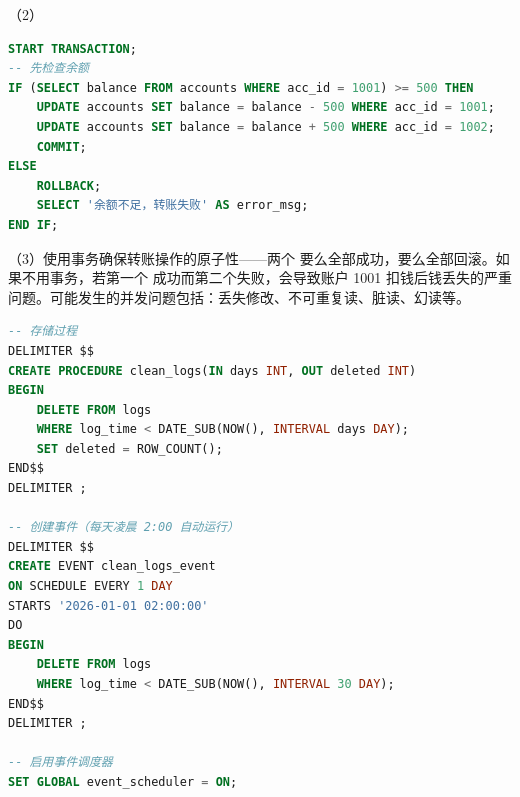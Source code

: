 \documentclass[a4paper,11pt]{article}
\begin{document}
\par （2）
\begin{lstlisting}[language=SQL]
START TRANSACTION;
-- 先检查余额
IF (SELECT balance FROM accounts WHERE acc_id = 1001) >= 500 THEN
    UPDATE accounts SET balance = balance - 500 WHERE acc_id = 1001;
    UPDATE accounts SET balance = balance + 500 WHERE acc_id = 1002;
    COMMIT;
ELSE
    ROLLBACK;
    SELECT '余额不足，转账失败' AS error_msg;
END IF;
\end{lstlisting}

\par （3）使用事务确保转账操作的原子性——两个  要么全部成功，要么全部回滚。如果不用事务，若第一个  成功而第二个失败，会导致账户 1001 扣钱后钱丢失的严重问题。可能发生的并发问题包括：丢失修改、不可重复读、脏读、幻读等。

\q
\begin{lstlisting}[language=SQL]
-- 存储过程
DELIMITER $$
CREATE PROCEDURE clean_logs(IN days INT, OUT deleted INT)
BEGIN
    DELETE FROM logs
    WHERE log_time < DATE_SUB(NOW(), INTERVAL days DAY);
    SET deleted = ROW_COUNT();
END$$
DELIMITER ;

-- 创建事件（每天凌晨 2:00 自动运行）
DELIMITER $$
CREATE EVENT clean_logs_event
ON SCHEDULE EVERY 1 DAY
STARTS '2026-01-01 02:00:00'
DO
BEGIN
    DELETE FROM logs
    WHERE log_time < DATE_SUB(NOW(), INTERVAL 30 DAY);
END$$
DELIMITER ;

-- 启用事件调度器
SET GLOBAL event_scheduler = ON;
\end{lstlisting}
\end{document}

